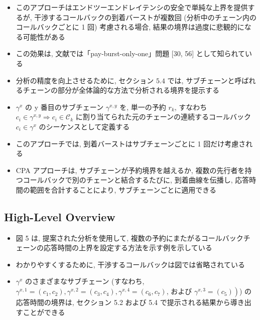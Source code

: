 \begin{frame}{}
    \begin{itemize}
        \item このアプローチはエンドツーエンドレイテンシの安全で単純な上界を提供するが, 干渉するコールバックの到着バーストが複数回 (分析中のチェーン内のコールバックごとに 1 回) 考慮される場合, 結果の境界は過度に悲観的になる可能性がある
        \item この効果は, 文献では「pay-burst-only-one」問題 [30, 56] として知られている
        \item 分析の精度を向上させるために, セクション $5.4$ では, サブチェーンと呼ばれるチェーンの部分が全体論的な方法で分析される境界を提示する
        \item $\gamma^{x}$ の y 番目のサブチェーン $\gamma^{x, y}$ を, 単一の予約 $r_{k}$, すなわち $c_{i} \in \gamma^{x, y} \Rightarrow c_{i} \in \mathcal{C}_{k}$ に割り当てられた元のチェーンの連続するコールバック $c_{i} \in \gamma^{x}$ のシーケンスとして定義する
        \item このアプローチでは, 到着バーストはサブチェーンごとに 1 回だけ考慮される
        \item CPA アプローチは, サブチェーンが予約境界を越えるか, 複数の先行者を持つコールバックで別のチェーンと結合するたびに, 到着曲線を伝播し, 応答時間の範囲を合計することにより, サブチェーンごとに適用できる
    \end{itemize}
\end{frame}


\subsection{High-Level Overview}
\label{ssec: high-level overview}

\begin{frame}{}
    \begin{itemize}
        \item 図 5 は, 提案された分析を使用して, 複数の予約にまたがるコールバックチェーンの応答時間の上界を設定する方法を示す例を示している
        \item わかりやすくするために, 干渉するコールバックは図では省略されている
        \item $\gamma^{x}$ のさまざまなサブチェーン (すなわち, $\gamma^{x, 1}=\left(c_{1}, c_{2}\right), \gamma^{x, 2}=\left(c_{3}, c_{4}\right), \gamma^{x, 4}=\left(c_{6}, c_{7}\right)$, および $\left.\gamma^{x, 3}=\left(c_{5}\right)\right)$) の応答時間の境界は, セクション 5.2 および 5.4 で提示される結果から導き出すことができる
    \end{itemize}
\end{frame}

